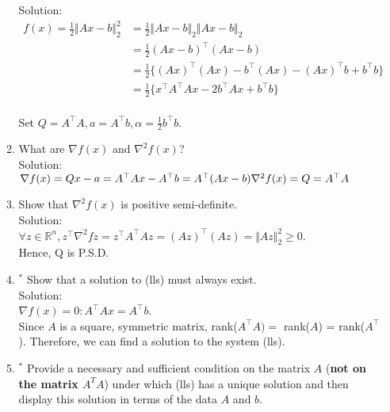 \documentclass[12pt]{amsart}
\newcommand{\norm}[1]{\Vert #1 \Vert}
\newcommand{\grad}{\nabla}
\begin{document}
\begin{enumerate}
\begin{enumerate}
\noindent
Solution:\\
\begin{align*}
f(x) = \frac{1}{2} \norm{Ax-b}^2_2 &= \frac{1}{2}\norm{Ax-b}_2 \norm{Ax-b}_2 \\
&= \frac{1}{2} (Ax-b)^\top (Ax-b) \\
&= \frac{1}{2} \{(Ax)^\top (Ax) - b^\top (Ax) - (Ax)^\top b + b^\top b \} \\
&= \frac{1}{2} \{x^\top A^\top A x - 2 b^\top Ax + b^\top b \} 
\end{align*} \\

Set $Q = A^\top A, a = A^\top b, \alpha = \frac{1}{2} b^\top b$. \\

\item What are $\grad f(x)$ and $\grad^2 f(x)$? \\

\noindent
Solution: \\
$\grad f(x) = Qx - a = A^\top Ax - A^\top b = A^\top (Ax-b) \\
\grad^2 f(x) = Q = A^\top A$ \\

\item Show that $\grad^2 f(x)$ is positive semi-definite. \\

\noindent
Solution: \\
$ \forall z \in \mathbb{R}^n, z^\top \grad^2 f z = z^\top A^\top A z = (Az)^\top (Az) = \norm{Az}^2_2 \geq 0$.  \\
Hence, Q is P.S.D.  \\

\item$^*$ Show that a solution to (lls) must always exist.\\

\noindent
Solution:\\
$\grad f(x)=0: A^\top Ax = A^\top b$. \\
Since $A$ is a square, symmetric matrix, rank($A^\top A)=$ rank($A$) = rank($A^\top$).  Therefore, we can find a solution to the system (lls).\\

\item$^*$ Provide a necessary and sufficient condition on the matrix
$A$ ({\bf not on the matrix $A^TA$}) under which (lls)
has a unique solution and then display this solution in terms
of the data $A$ and $b$.\\


\end{enumerate}
\end{enumerate}
\end{document}
